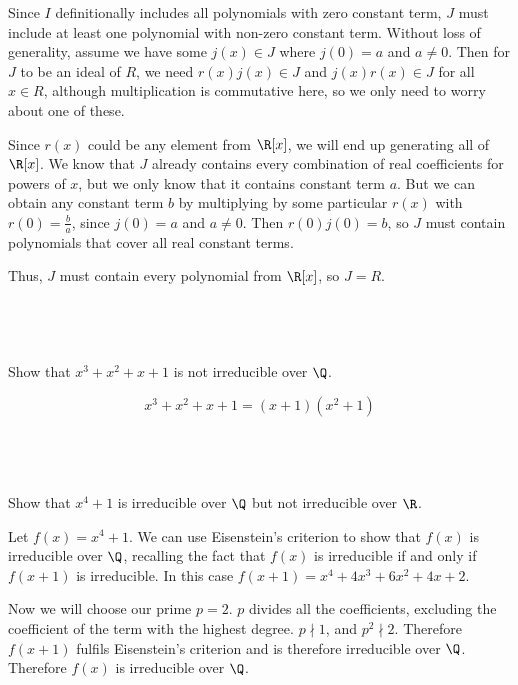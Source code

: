 \documentclass[a4paper]{article}
\begin{document}
Since $I$ definitionally includes all polynomials with zero constant term, $J$ must include at least one polynomial with non-zero constant term. Without loss of generality, assume we have some $j(x) \in J$ where $j(0) = a$ and $a \ne 0$. Then for $J$ to be an ideal of $R$, we need $r(x) j(x) \in J$ and $j(x) r(x) \in J$ for all $x \in R$, although multiplication is commutative here, so we only need to worry about one of these.

Since $r(x)$ could be any element from $\R[x]$, we will end up generating all of $\R[x]$. We know that $J$ already contains every combination of real coefficients for powers of $x$, but we only know that it contains constant term $a$. But we can obtain any constant term $b$ by multiplying by some particular $r(x)$ with $r(0) = \frac ba$, since $j(0) = a$ and $a \ne 0$. Then $r(0) j(0) = b$, so $J$ must contain polynomials that cover all real constant terms.

Thus, $J$ must contain every polynomial from $\R[x]$, so $J = R$.


\subsection{~} %

\begin{questionbody}
Show that $x^3 + x^2 + x + 1$ is not irreducible over $\Q$.
\end{questionbody}

\[ x^3 + x^2 + x + 1 = (x + 1) (x^2 + 1) \]

\subsection{~} %

\begin{questionbody}
Show that $x^4 + 1$ is irreducible over $\Q$ but not irreducible over $\R$.
\end{questionbody}

Let $f(x) = x^4 + 1$. We can use Eisenstein's criterion to show that $f(x)$ is irreducible over $\Q$, recalling the fact that $f(x)$ is irreducible if and only if $f(x+1)$ is irreducible. In this case $f(x+1) = x^4 + 4x^3 + 6x^2 + 4x + 2$.

Now we will choose our prime $p=2$. $p$ divides all the coefficients, excluding the coefficient of the term with the highest degree. $p \nmid 1$, and $p^2 \nmid 2$. Therefore $f(x+1)$ fulfils Eisenstein's criterion and is therefore irreducible over $\Q$. Therefore $f(x)$ is irreducible over $\Q$.
\end{document}

